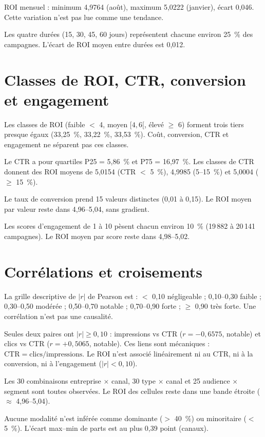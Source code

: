 ROI mensuel : minimum 4,9764 (août), maximum 5,0222 (janvier), écart 0,046. Cette variation n'est pas lue comme une tendance.

Les quatre durées (15, 30, 45, 60 jours) représentent chacune environ 25~\% des campagnes. L'écart de ROI moyen entre durées est 0,012.

\section{Classes de ROI, CTR, conversion et engagement}

Les classes de ROI (faible $<$ 4, moyen $[4,6[$, élevé $\geq$ 6) forment trois tiers presque égaux (33,25~\%, 33,22~\%, 33,53~\%). Coût, conversion, CTR et engagement ne séparent pas ces classes.

Le CTR a pour quartiles P25 = 5,86~\% et P75 = 16,97~\%. Les classes de CTR donnent des ROI moyens de 5,0154 (CTR $<$ 5~\%), 4,9985 (5--15~\%) et 5,0004 ($\geq$ 15~\%).

Le taux de conversion prend 15 valeurs distinctes (0,01 à 0,15). Le ROI moyen par valeur reste dans 4,96--5,04, sans gradient.

Les scores d'engagement de 1 à 10 pèsent chacun environ 10~\% (19\,882 à 20\,141 campagnes). Le ROI moyen par score reste dans 4,98--5,02.

\section{Corrélations et croisements}

La grille descriptive de $|r|$ de Pearson est : $<$ 0,10 négligeable ; 0,10--0,30 faible ; 0,30--0,50 modérée ; 0,50--0,70 notable ; 0,70--0,90 forte ; $\geq$ 0,90 très forte. Une corrélation n'est pas une causalité.

Seules deux paires ont $|r| \geq 0,10$ : impressions vs CTR ($r = -0,6575$, notable) et clics vs CTR ($r = +0,5065$, notable). Ces liens sont mécaniques : $\mathrm{CTR} = \mathrm{clics}/\mathrm{impressions}$. Le ROI n'est associé linéairement ni au CTR, ni à la conversion, ni à l'engagement ($|r| < 0,10$).

Les 30 combinaisons entreprise $\times$ canal, 30 type $\times$ canal et 25 audience $\times$ segment sont toutes observées. Le ROI des cellules reste dans une bande étroite ($\approx$ 4,96--5,04).

Aucune modalité n'est inférée comme dominante ($>$ 40~\%) ou minoritaire ($<$ 5~\%). L'écart max--min de parts est au plus 0,39 point (canaux).
